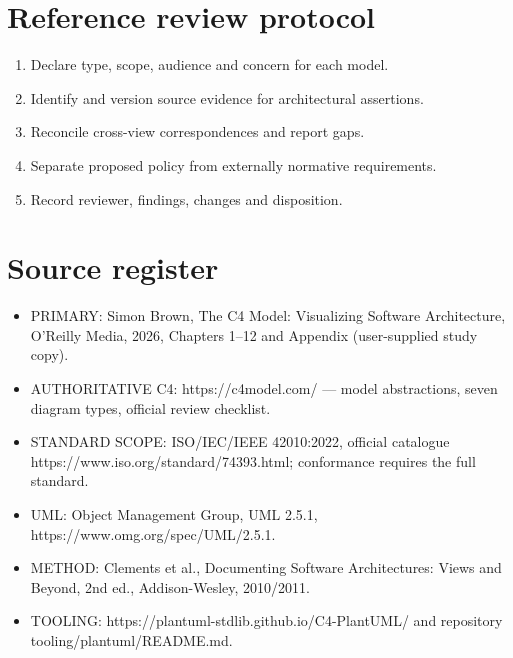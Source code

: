 \documentclass[10pt,letterpaper]{article}
\begin{document}
\section{Reference review protocol}
\begin{enumerate}
\item Declare type, scope, audience and concern for each model.
\item Identify and version source evidence for architectural assertions.
\item Reconcile cross-view correspondences and report gaps.
\item Separate proposed policy from externally normative requirements.
\item Record reviewer, findings, changes and disposition.
\end{enumerate}

\section{Source register}
\begin{itemize}
\item PRIMARY: Simon Brown, The C4 Model: Visualizing Software Architecture, O’Reilly Media, 2026, Chapters 1–12 and Appendix (user-supplied study copy).
\item AUTHORITATIVE C4: https://c4model.com/ — model abstractions, seven diagram types, official review checklist.
\item STANDARD SCOPE: ISO/IEC/IEEE 42010:2022, official catalogue https://www.iso.org/standard/74393.html; conformance requires the full standard.
\item UML: Object Management Group, UML 2.5.1, https://www.omg.org/spec/UML/2.5.1.
\item METHOD: Clements et al., Documenting Software Architectures: Views and Beyond, 2nd ed., Addison-Wesley, 2010/2011.
\item TOOLING: https://plantuml-stdlib.github.io/C4-PlantUML/ and repository tooling/plantuml/README.md.
\end{itemize}
\end{document}
